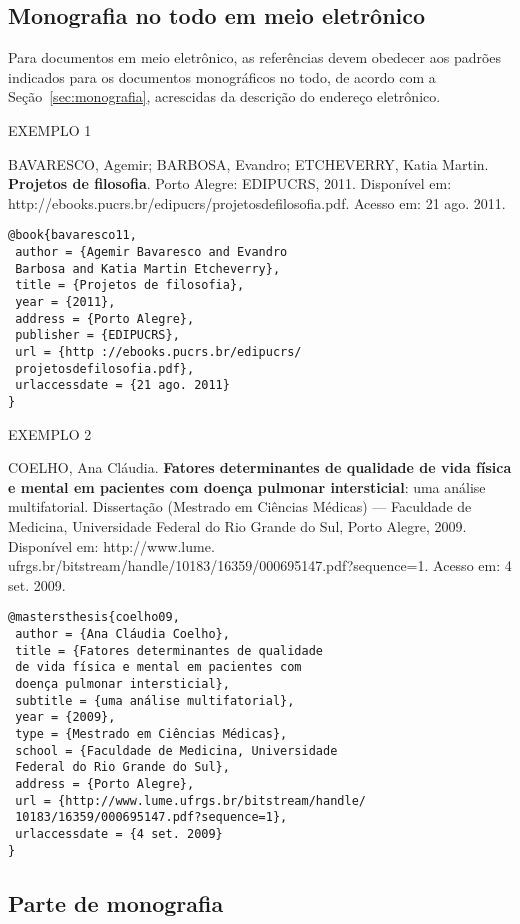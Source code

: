 \subsection{Monografia no todo em meio eletrônico}

Para documentos em meio eletrônico, as referências devem obedecer aos padrões indicados para os documentos monográficos no todo, de acordo com a Seção~\ref{sec:monografia}, acrescidas da descrição do endereço eletrônico.

EXEMPLO 1 

BAVARESCO, Agemir; BARBOSA, Evandro; ETCHEVERRY, Katia Martin. \textbf{Projetos de filosofia}. Porto Alegre: EDIPUCRS, 2011. Disponível em: http://ebooks.pucrs.br/edipucrs/projetosdefilosofia.pdf. Acesso em: 21 ago. 2011.

\begin{verbatim}
@book{bavaresco11,
 author = {Agemir Bavaresco and Evandro 
 Barbosa and Katia Martin Etcheverry},
 title = {Projetos de filosofia},
 year = {2011},
 address = {Porto Alegre},
 publisher = {EDIPUCRS},
 url = {http ://ebooks.pucrs.br/edipucrs/
 projetosdefilosofia.pdf},
 urlaccessdate = {21 ago. 2011}
}
\end{verbatim}

EXEMPLO 2

COELHO, Ana Cláudia. \textbf{Fatores determinantes de qualidade de vida física e mental em pacientes com doença pulmonar intersticial}: uma análise multifatorial. Dissertação (Mestrado em Ciências Médicas) — Faculdade de Medicina, Universidade Federal do Rio Grande do Sul, Porto Alegre, 2009. Disponível em: http://www.lume. ufrgs.br/bitstream/handle/10183/16359/000695147.pdf?sequence=1. Acesso em: 4 set. 2009.

\begin{verbatim}
@mastersthesis{coelho09,
 author = {Ana Cláudia Coelho},
 title = {Fatores determinantes de qualidade 
 de vida física e mental em pacientes com 
 doença pulmonar intersticial},
 subtitle = {uma análise multifatorial},
 year = {2009},
 type = {Mestrado em Ciências Médicas},
 school = {Faculdade de Medicina, Universidade 
 Federal do Rio Grande do Sul},
 address = {Porto Alegre},
 url = {http://www.lume.ufrgs.br/bitstream/handle/
 10183/16359/000695147.pdf?sequence=1},
 urlaccessdate = {4 set. 2009}
}
\end{verbatim}

\subsection{Parte de monografia}

